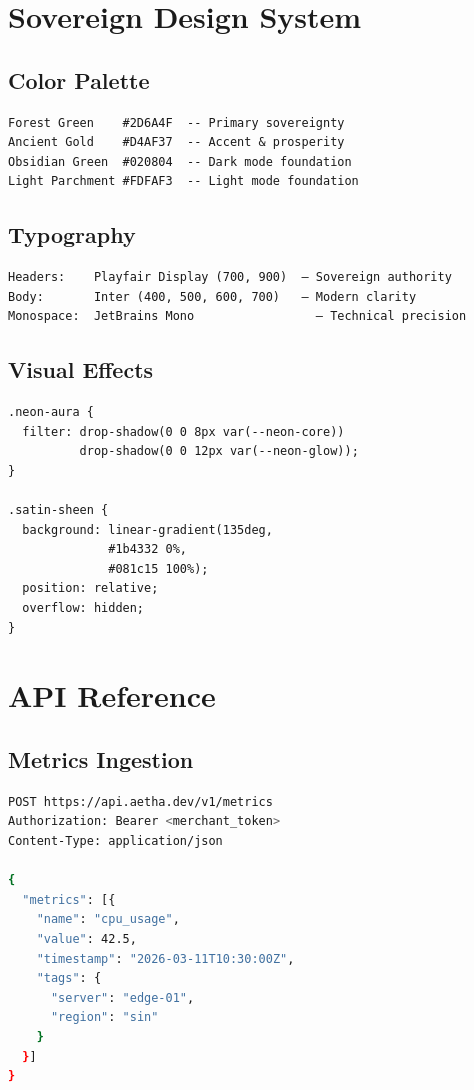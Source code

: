 \documentclass[12pt]{article}
\begin{document}
\section{Sovereign Design System}

\subsection{Color Palette}

\begin{verbatim}
Forest Green    #2D6A4F  -- Primary sovereignty
Ancient Gold    #D4AF37  -- Accent & prosperity
Obsidian Green  #020804  -- Dark mode foundation
Light Parchment #FDFAF3  -- Light mode foundation
\end{verbatim}

\subsection{Typography}

\begin{verbatim}
Headers:    Playfair Display (700, 900)  — Sovereign authority
Body:       Inter (400, 500, 600, 700)   — Modern clarity
Monospace:  JetBrains Mono                 — Technical precision
\end{verbatim}

\subsection{Visual Effects}

\begin{verbatim}
.neon-aura {
  filter: drop-shadow(0 0 8px var(--neon-core))
          drop-shadow(0 0 12px var(--neon-glow));
}

.satin-sheen {
  background: linear-gradient(135deg,
              #1b4332 0%,
              #081c15 100%);
  position: relative;
  overflow: hidden;
}
\end{verbatim}

\section{API Reference}

\subsection{Metrics Ingestion}

\begin{lstlisting}[language=bash]
POST https://api.aetha.dev/v1/metrics
Authorization: Bearer <merchant_token>
Content-Type: application/json

{
  "metrics": [{
    "name": "cpu_usage",
    "value": 42.5,
    "timestamp": "2026-03-11T10:30:00Z",
    "tags": {
      "server": "edge-01",
      "region": "sin"
    }
  }]
}
\end{lstlisting}
\end{document}
